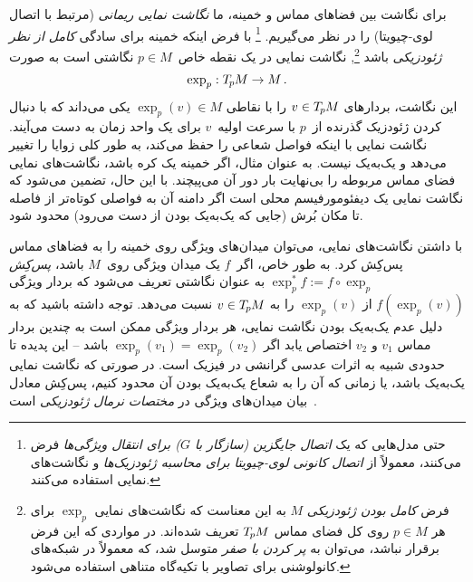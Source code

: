 برای نگاشت بین فضاهای مماس و خمینه، ما \emph{نگاشت نمایی ریمانی} (مرتبط با اتصال لوی-چیویتا) را در نظر می‌گیریم.%
\footnote{
	حتی مدل‌هایی که یک \emph{اتصال جایگزین (سازگار با $G$) برای انتقال ویژگی‌ها} فرض می‌کنند، معمولاً از \emph{اتصال کانونی لوی-چیویتا برای محاسبه ژئودزیک‌ها} و نگاشت‌های نمایی استفاده می‌کنند.
}
با فرض اینکه خمینه برای سادگی \emph{کامل از نظر ژئودزیکی} باشد%
\footnote{
	فرض \emph{کامل بودن ژئودزیکی} $M$ به این معناست که نگاشت‌های نمایی $\exp_p$ برای هر $p \in M$ روی کل فضای مماس $T_{\mkern-1.5mu p}\mkern-.5muM$ تعریف شده‌اند.
	در مواردی که این فرض برقرار نباشد، می‌توان به \emph{پر کردن با صفر} متوسل شد، که معمولاً در شبکه‌های کانولوشنی برای تصاویر با تکیه‌گاه متناهی استفاده می‌شود.
},
نگاشت نمایی در یک نقطه خاص~$p\in M$ نگاشتی است به صورت
\begin{align}
	\exp_p: T_{\mkern-1.5mu p}\mkern-.5muM \to M \,.
\end{align}
این نگاشت، بردارهای $v\in T_{\mkern-1.5mu p}\mkern-.5muM$ را با نقاطی $\exp_p(v) \in M$ یکی می‌داند که با دنبال کردن ژئودزیک گذرنده از~$p$ با سرعت اولیه~$v$ برای یک واحد زمان به دست می‌آیند.
نگاشت نمایی با اینکه فواصل شعاعی را حفظ می‌کند، به طور کلی زوایا را تغییر می‌دهد و یک‌به‌یک نیست.
به عنوان مثال، اگر خمینه یک کره باشد، نگاشت‌های نمایی فضای مماس مربوطه را بی‌نهایت بار دور آن می‌پیچند.
با این حال، تضمین می‌شود که نگاشت نمایی یک دیفئومورفیسم محلی است اگر دامنه آن به فواصلی کوتاه‌تر از فاصله تا مکان بُرش (جایی که یک‌به‌یک بودن از دست می‌رود) محدود شود.

با داشتن نگاشت‌های نمایی، می‌توان میدان‌های ویژگی روی خمینه را به فضاهای مماس پس‌کِش کرد.
به طور خاص، اگر~$f$ یک میدان ویژگی روی~$M$ باشد، \emph{پس‌کِش} $\exp_p^*f := f \circ \exp_p$ به عنوان نگاشتی تعریف می‌شود که بردار ویژگی $f(\exp_p(v))$ از $\exp_p(v)$ را به $v\in T_{\mkern-1.5mu p}\mkern-.5muM$ نسبت می‌دهد.
توجه داشته باشید که به دلیل عدم یک‌به‌یک بودن نگاشت نمایی، هر بردار ویژگی ممکن است به چندین بردار مماس $v_1$ و $v_2$ اختصاص یابد اگر $\exp_p(v_1) = \exp_p(v_2)$ باشد -- این پدیده تا حدودی شبیه به اثرات عدسی گرانشی در فیزیک است.
در صورتی که نگاشت نمایی یک‌به‌یک باشد، یا زمانی که آن را به شعاع یک‌به‌یک بودن آن محدود کنیم، پس‌کِش معادل بیان میدان‌های ویژگی در \emph{مختصات نرمال ژئودزیکی} است~\cite{masci2015geodesic}.

